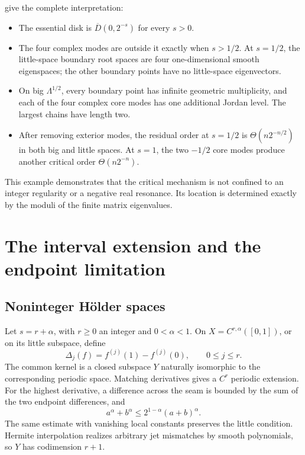 \documentclass[11pt,a4paper]{article}
\numberwithin{equation}{section}
\theoremstyle{definition}
\theoremstyle{remark}
\newcommand{\disk}[1]{\overline{D}(0,#1)}
\begin{document}
give the complete interpretation:
\begin{itemize}
\item The essential disk is $\disk{2^{-s}}$ for every $s>0$.
\item The four complex modes are outside it exactly when $s>1/2$.
At $s=1/2$, the little-space boundary root spaces are four
one-dimensional smooth eigenspaces; the other boundary points have
no little-space eigenvectors.
\item On big $\Lambda^{1/2}$, every boundary point has infinite
geometric multiplicity, and each of the four complex core modes has
one additional Jordan level. The largest chains have length two.
\item After removing exterior modes, the residual order at $s=1/2$
is $\Theta(n2^{-n/2})$ in both big and little spaces. At $s=1$,
the two $-1/2$ core modes produce another critical order
$\Theta(n2^{-n})$.
\end{itemize}
This example demonstrates that the critical mechanism is not confined
to an integer regularity or a negative real resonance. Its location is
determined exactly by the moduli of the finite matrix eigenvalues.

\section{The interval extension and the endpoint limitation}
\label{sec:interval}

\subsection{Noninteger H\"older spaces}
Let $s=r+\alpha$, with $r\ge0$ an integer and $0<\alpha<1$.
On $X=C^{r,\alpha}([0,1])$, or on its little subspace, define
\begin{equation}
 \Delta_j(f)=f^{(j)}(1)-f^{(j)}(0),\qquad 0\le j\le r.
 \label{eq:jets}
\end{equation}
The common kernel is a closed subspace $Y$ naturally isomorphic to the
corresponding periodic space. Matching derivatives gives a $C^r$
periodic extension. For the highest derivative, a difference across the
seam is bounded by the sum of the two endpoint differences, and
\[
 a^\alpha+b^\alpha\le2^{1-\alpha}(a+b)^\alpha.
\]
The same estimate with vanishing local constants preserves the little
condition. Hermite interpolation realizes arbitrary jet mismatches by
smooth polynomials, so $Y$ has codimension $r+1$.
\end{document}
